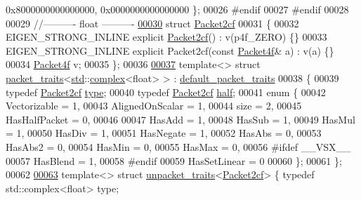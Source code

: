 \begin{DoxyCode}
{       0x8000000000000000, 0x0000000000000000 \};}
00026 \textcolor{preprocessor}{#endif}
00027 \textcolor{preprocessor}{#endif}
00028 
00029 \textcolor{comment}{//---------- float ----------}
\hyperlink{struct_eigen_1_1internal_1_1_packet2cf}{00030} \textcolor{keyword}{struct }\hyperlink{struct_eigen_1_1internal_1_1_packet2cf}{Packet2cf}
00031 \{
00032   EIGEN\_STRONG\_INLINE \textcolor{keyword}{explicit} \hyperlink{struct_eigen_1_1internal_1_1_packet2cf}{Packet2cf}() : v(p4f\_ZERO) \{\}
00033   EIGEN\_STRONG\_INLINE \textcolor{keyword}{explicit} Packet2cf(\textcolor{keyword}{const} \hyperlink{struct_eigen_1_1internal_1_1_packet4f}{Packet4f}& a) : v(a) \{\}
00034   \hyperlink{struct_eigen_1_1internal_1_1_packet4f}{Packet4f}  v;
00035 \};
00036 
\hyperlink{struct_eigen_1_1internal_1_1packet__traits_3_01std_1_1complex_3_01float_01_4_01_4}{00037} \textcolor{keyword}{template}<> \textcolor{keyword}{struct }\hyperlink{struct_eigen_1_1internal_1_1packet__traits}{packet\_traits}<\hyperlink{namespacestd}{std}::\hyperlink{structcomplex}{complex}<float> >  : 
      \hyperlink{struct_eigen_1_1internal_1_1default__packet__traits}{default\_packet\_traits}
00038 \{
00039   \textcolor{keyword}{typedef} \hyperlink{struct_eigen_1_1internal_1_1_packet2cf}{Packet2cf} \hyperlink{struct_eigen_1_1internal_1_1_packet2cf}{type};
00040   \textcolor{keyword}{typedef} \hyperlink{struct_eigen_1_1internal_1_1_packet2cf}{Packet2cf} \hyperlink{struct_eigen_1_1internal_1_1_packet2cf}{half};
00041   \textcolor{keyword}{enum} \{
00042     Vectorizable = 1,
00043     AlignedOnScalar = 1,
00044     size = 2,
00045     HasHalfPacket = 0,
00046 
00047     HasAdd    = 1,
00048     HasSub    = 1,
00049     HasMul    = 1,
00050     HasDiv    = 1,
00051     HasNegate = 1,
00052     HasAbs    = 0,
00053     HasAbs2   = 0,
00054     HasMin    = 0,
00055     HasMax    = 0,
00056 \textcolor{preprocessor}{#ifdef \_\_VSX\_\_}
00057     HasBlend  = 1,
00058 \textcolor{preprocessor}{#endif}
00059     HasSetLinear = 0
00060   \};
00061 \};
00062 
\hyperlink{struct_eigen_1_1internal_1_1unpacket__traits_3_01_packet2cf_01_4}{00063} \textcolor{keyword}{template}<> \textcolor{keyword}{struct }\hyperlink{struct_eigen_1_1internal_1_1unpacket__traits}{unpacket\_traits}<\hyperlink{struct_eigen_1_1internal_1_1_packet2cf}{Packet2cf}> \{ \textcolor{keyword}{typedef} std::complex<float> type; \textcolor{keyword}{
}
\end{DoxyCode}
